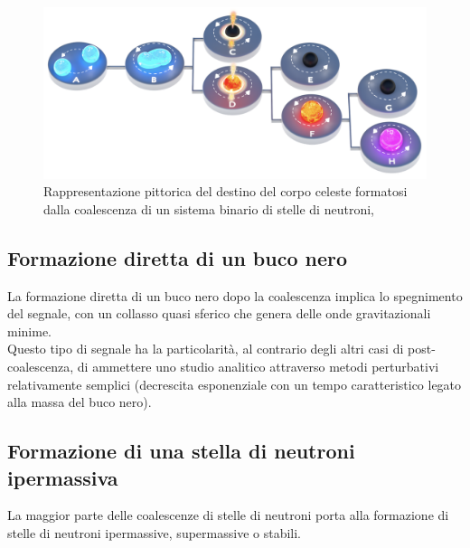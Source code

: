 \vspace{0pt}
\begin{figure}
	\includegraphics[scale=0.2]{figures/Capitolo_1/MagnetarEvolution.png}
	\captionsetup{width=0.8\textwidth}
	\caption{Rappresentazione pittorica del destino del corpo celeste formatosi dalla coalescenza di un sistema binario di stelle di neutroni, \cite{sarin2020evolution}}
	\label{fig:EvoluzioneBNS}
	\vspace{-20pt}
\end{figure}

\subsection{Formazione diretta di un buco nero}	
\label{subsection:Diretto_Black_hole}
La formazione diretta di un buco nero dopo la coalescenza implica lo spegnimento del segnale, con un collasso quasi sferico che genera delle onde gravitazionali minime\cite{sarin2020evolution}.\\
Questo tipo di segnale ha la particolarità, al contrario degli altri casi di post-coalescenza, di ammettere uno studio analitico attraverso metodi perturbativi relativamente semplici (decrescita esponenziale con un tempo caratteristico legato alla massa del buco nero)\cite{maggiore2018gravitational}.

\subsection{Formazione di una stella di neutroni ipermassiva}
\label{subsection:ipermassiva}	
La maggior parte delle coalescenze di stelle di neutroni porta alla formazione di stelle di neutroni ipermassive, supermassive o stabili\cite{sarin2020evolution}. 

